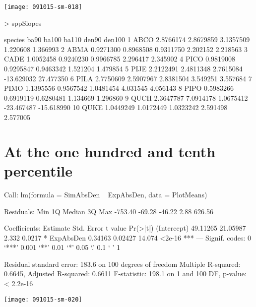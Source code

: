 \documentclass{article}
\begin{document}
\texttt{[image: 091015-sm-018]}
\begin{Schunk}
\begin{Sinput}
>   sppSlopes
\end{Sinput}
\begin{Soutput}
   species      ba90     ba100     ba110      den90     den100
1     ABCO 2.8766174 2.8679859 3.1357509   1.220608   1.366993
2     ABMA 0.9271300 0.8968508 0.9311750   2.202152   2.218563
3     CADE 1.0052458 0.9240230 0.9966785   2.296417   2.345902
4     PICO 0.9819008 0.9295847 0.9463342   1.521204   1.479854
5     PIJE 2.2122491 2.4811348 2.7615084 -13.629032  27.477350
6     PILA 2.7750609 2.5907967 2.8381504   3.549251   3.557684
7     PIMO 1.1395556 0.9567542 1.0481454   4.031545   4.056143
8     PIPO 0.5983266 0.6919119 0.6280481   1.134669   1.296860
9     QUCH 2.3647787 7.0914178 1.0675412 -23.467487 -15.618990
10    QUKE 1.0449249 1.0172449 1.0323242   2.591498   2.577005
\end{Soutput}
\end{Schunk}





\newpage
\section{At the one hundred and tenth percentile}
\begin{Schunk}
\begin{Soutput}
Call:
lm(formula = SimAbsDen ~ ExpAbsDen, data = PlotMeans)

Residuals:
    Min      1Q  Median      3Q     Max 
-753.40  -69.28  -46.22    2.88  626.56 

Coefficients:
            Estimate Std. Error t value Pr(>|t|)    
(Intercept) 49.11265   21.05987   2.332   0.0217 *  
ExpAbsDen    0.34163    0.02427  14.074   <2e-16 ***
---
Signif. codes:  0 ‘***’ 0.001 ‘**’ 0.01 ‘*’ 0.05 ‘.’ 0.1 ‘ ’ 1

Residual standard error: 183.6 on 100 degrees of freedom
Multiple R-squared:  0.6645,	Adjusted R-squared:  0.6611 
F-statistic: 198.1 on 1 and 100 DF,  p-value: < 2.2e-16
\end{Soutput}
\end{Schunk}
\texttt{[image: 091015-sm-020]}
\end{document}

